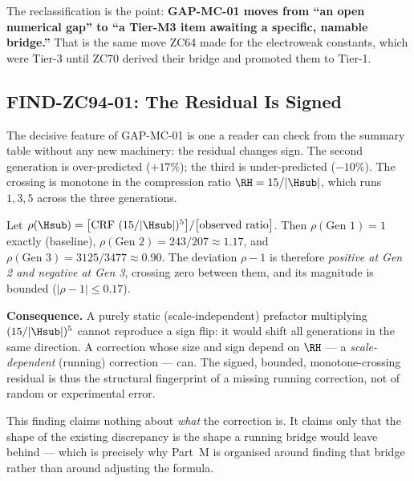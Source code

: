 \documentclass[12pt, a4paper]{article}
\begin{document}
The reclassification is the point: \textbf{GAP-MC-01 moves from ``an open
numerical gap'' to ``a Tier-M3 item awaiting a specific, namable bridge.''} That
is the same move ZC64 made for the electroweak constants, which were Tier-3
until ZC70 derived their bridge and promoted them to Tier-1.

\subsection{FIND-ZC94-01: The Residual Is Signed}
\label{sec:signed-zc94}

The decisive feature of GAP-MC-01 is one a reader can check from the summary
table without any new machinery: the residual changes sign. The second
generation is over-predicted ($+17\%$); the third is under-predicted ($-10\%$).
The crossing is monotone in the compression ratio $\RH=15/|\Hsub|$, which runs
$1, 3, 5$ across the three generations.

\begin{formalbox}[title={FIND-ZC94-01: The GAP-MC-01 Residual Is Signed
  and Bounded (Exact observation)}]
Let $\rho(\Hsub)=\big[\text{CRF }(15/|\Hsub|)^5\big]/\big[\text{observed
ratio}\big]$. Then $\rho(\text{Gen 1})=1$ exactly (baseline),
$\rho(\text{Gen 2})=243/207\approx1.17$, and
$\rho(\text{Gen 3})=3125/3477\approx0.90$. The deviation $\rho-1$ is therefore
\emph{positive at Gen 2 and negative at Gen 3}, crossing zero between them, and
its magnitude is bounded ($|\rho-1|\le0.17$).

\textbf{Consequence.} A purely static (scale-independent) prefactor multiplying
$(15/|\Hsub|)^5$ cannot reproduce a sign flip: it would shift all generations in
the same direction. A correction whose size and sign depend on $\RH$ --- a
\emph{scale-dependent} (running) correction --- can. The signed, bounded,
monotone-crossing residual is thus the structural fingerprint of a missing
running correction, not of random or experimental error.
\end{formalbox}

This finding claims nothing about \emph{what} the correction is. It claims only
that the shape of the existing discrepancy is the shape a running bridge would
leave behind --- which is precisely why Part~M is organised around finding that
bridge rather than around adjusting the formula.

\end{document}
